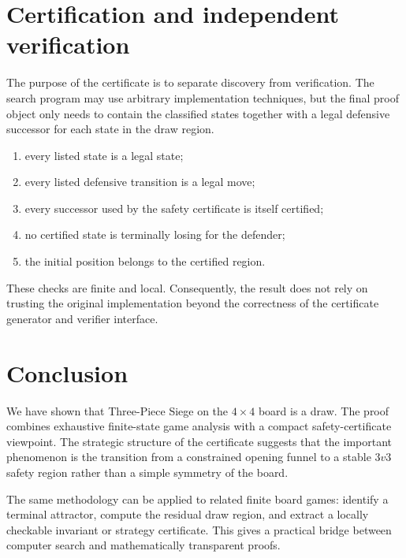 \documentclass[11pt,a4paper]{article}
\theoremstyle{plain}
\theoremstyle{definition}
\begin{document}
\section{Certification and independent verification}
The purpose of the certificate is to separate discovery from verification. The search program may use arbitrary implementation techniques, but the final proof object only needs to contain the classified states together with a legal defensive successor for each state in the draw region.
\begin{enumerate}[label=(\arabic*)]
\item every listed state is a legal state;
\item every listed defensive transition is a legal move;
\item every successor used by the safety certificate is itself certified;
\item no certified state is terminally losing for the defender;
\item the initial position belongs to the certified region.
\end{enumerate}
These checks are finite and local. Consequently, the result does not rely on trusting the original implementation beyond the correctness of the certificate generator and verifier interface.
\section{Conclusion}
We have shown that Three-Piece Siege on the $4\times4$ board is a draw. The proof combines exhaustive finite-state game analysis with a compact safety-certificate viewpoint. The strategic structure of the certificate suggests that the important phenomenon is the transition from a constrained opening funnel to a stable $3v3$ safety region rather than a simple symmetry of the board.

The same methodology can be applied to related finite board games: identify a terminal attractor, compute the residual draw region, and extract a locally checkable invariant or strategy certificate. This gives a practical bridge between computer search and mathematically transparent proofs.
\end{document}
